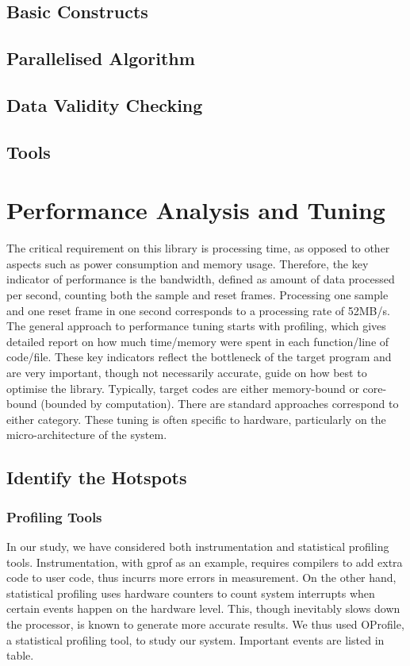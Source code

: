 \documentclass[journal]{IEEEtran}
\begin{document}
\subsection{Basic Constructs}

\subsection{Parallelised Algorithm}
\subsection{Data Validity Checking}
\subsection{Tools}

\section{Performance Analysis and Tuning} %
The critical requirement on this library is processing time, as opposed to other aspects such as power consumption and memory usage. Therefore, the key indicator of performance is the bandwidth, defined as amount of data processed per second, counting both the sample and reset frames. Processing one sample and one reset frame in one second corresponds to a processing rate of 52MB/s. The general approach to performance tuning starts with profiling, which gives detailed report on how much time/memory were spent in each function/line of code/file. These key indicators reflect the bottleneck of the target program and are very important, though not necessarily accurate, guide on how best to optimise the library. Typically, target codes are either memory-bound or core-bound (bounded by computation). There are standard approaches correspond to either category. These tuning is often specific to hardware, particularly on the micro-architecture of the system.
\subsection{Identify the Hotspots}
\subsubsection{Profiling Tools}
In our study, we have considered both instrumentation and statistical profiling tools. Instrumentation, with gprof as an example, requires compilers to add extra code to user code, thus incurrs more errors in measurement. On the other hand, statistical profiling uses hardware counters to count system interrupts when certain events happen on the hardware level. This, though inevitably slows down the processor, is known to generate more accurate results. We thus used OProfile, a statistical profiling tool, to study our system. Important events are listed in table.
\end{document}
